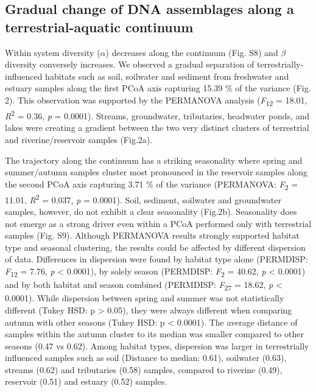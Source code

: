 \documentclass[12pt,a4paper]{article} %
\begin{document}
\subsection*{Gradual change of DNA assemblages along a terrestrial-aquatic continuum}
Within system diversity ($\alpha$) decreases along the continuum (Fig. S8) and  $\beta$ diversity conversely increases. We observed a gradual separation of terrestrially-influenced habitats such as soil, soilwater and sediment from freshwater and estuary samples along the first PCoA axis capturing 15.39 \% of the variance (Fig. 2). This observation was supported by the PERMANOVA analysis (\textit{F}\textsubscript{12} = 18.01, \textit{R}\textsuperscript{2} = 0.36, \textit{p} = 0.0001). Streams, groundwater, tributaries, headwater ponds, and lakes were creating a gradient between the two very distinct clusters of terrestrial and riverine/reservoir samples (Fig.2a).

The trajectory along the continuum has a striking seasonality where spring and summer/autumn samples cluster most pronounced in the reservoir samples along the second PCoA axis capturing 3.71 \% of the variance (PERMANOVA: \textit{F}\textsubscript{2} = 11.01, \textit{R}\textsuperscript{2} = 0.037, \textit{p} = 0.0001). Soil, sediment, soilwater and groundwater samples, however, do not exhibit a clear seasonality (Fig.2b). Seasonality does not emerge as a strong driver even within a PCoA performed only with terrestrial samples (Fig. S9). Although PERMANOVA results strongly supported habitat type and seasonal clustering, the results could be affected by different dispersion of data. Differences in dispersion were found by habitat type alone (PERMDISP: \textit{F}\textsubscript{12} = 7.76, \textit{p} < 0.0001), by solely season (PERMDISP: \textit{F}\textsubscript{2} = 40.62, \textit{p} < 0.0001) and by both habitat and season combined (PERMDISP: \textit{F}\textsubscript{27} = 18.62, \textit{p} < 0.0001). While dispersion between spring and summer was not statistically different (Tukey HSD: p > 0.05), they were always different when comparing autumn with other seasons (Tukey HSD: p < 0.0001). The average distance of samples within the autumn cluster to its median was smaller compared to other seasons (0.47 vs 0.62). Among habitat types, dispersion was larger in terrestrially influenced samples such as soil (Distance to median: 0.61), soilwater (0.63), streams (0.62) and tributaries (0.58) samples, compared to riverine (0.49), reservoir (0.51) and estuary (0.52) samples.
\end{document}
